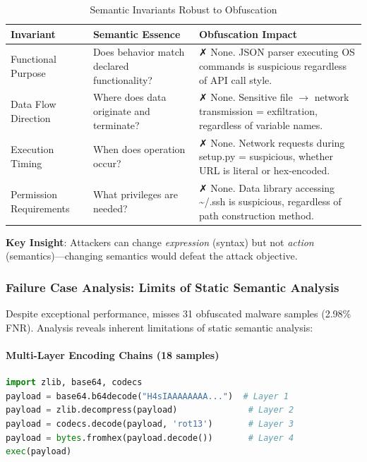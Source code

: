 \begin{table}[h]
\centering
\caption{Semantic Invariants Robust to Obfuscation}
\label{tab:semantic-invariants}
\small
\begin{tabular}{p{3.5cm}p{5cm}p{5.5cm}}
\toprule
\textbf{Invariant} & \textbf{Semantic Essence} & \textbf{Obfuscation Impact} \\
\midrule
Functional Purpose & Does behavior match declared functionality? & ✗ None. JSON parser executing OS commands is suspicious regardless of API call style. \\
\midrule
Data Flow Direction & Where does data originate and terminate? & ✗ None. Sensitive file $\rightarrow$ network transmission = exfiltration, regardless of variable names. \\
\midrule
Execution Timing & When does operation occur? & ✗ None. Network requests during setup.py = suspicious, whether URL is literal or hex-encoded. \\
\midrule
Permission Requirements & What privileges are needed? & ✗ None. Data library accessing \textasciitilde/.ssh is suspicious, regardless of path construction method. \\
\bottomrule
\end{tabular}
\end{table}

\textbf{Key Insight}: Attackers can change \emph{expression} (syntax) but not \emph{action} (semantics)---changing semantics would defeat the attack objective.

\subsubsection{Failure Case Analysis: Limits of Static Semantic Analysis}

Despite exceptional performance, \tool{} misses 31 obfuscated malware samples (2.98\% FNR). Analysis reveals inherent limitations of static semantic analysis:

\paragraph{Multi-Layer Encoding Chains (18 samples)}
\begin{lstlisting}[language=Python]
import zlib, base64, codecs
payload = base64.b64decode("H4sIAAAAAAAA...")  # Layer 1
payload = zlib.decompress(payload)              # Layer 2
payload = codecs.decode(payload, 'rot13')       # Layer 3
payload = bytes.fromhex(payload.decode())       # Layer 4
exec(payload)
\end{lstlisting}

